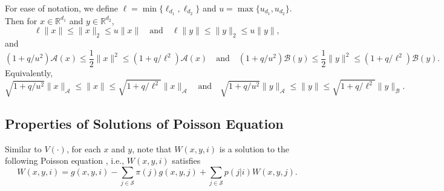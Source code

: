 \documentclass[letterpaper, 10 pt, conference]{ieeeconf}  %
\theoremstyle{definition}
\theoremstyle{plain}
\newcommand{\Scal}{\mathcal{S}}
\newcommand{\RR}{\mathbb{R}}
\newcommand{\Acal}{\mathcal{A}}
\newcommand{\Bcal}{\mathcal{B}}
\begin{document}
For ease of notation, we define $\ell=\min\{\ell_{d_1}, \ell_{d_2}\}$ and $u=\max\{u_{d_1}, u_{d_2}\}$. Then for $x\in\RR^{d_1}$ and $y\in\RR^{d_2}$, 
$$\ell \|x\|\leq \|x\|_2\leq u \|x\|\quad\text{and}\quad\ell\|y\|\leq \|y\|_2\leq u\|y\|,$$ and $$\left(1+q/u^2\right)\Acal(x)\leq \frac{1}{2}\|x\|^2\leq \left(1+q/\ell^2\right)\Acal(x)\quad\text{and}\quad \left(1+q/u^2\right)\Bcal(y)\leq \frac{1}{2}\|y\|^2\leq \left(1+q/\ell^2\right)\Bcal(y).$$ Equivalently, 
$$\sqrt{1+q/u^2}\|x\|_\Acal\leq \|x\|\leq \sqrt{1+q/\ell^2}\|x\|_\Acal\quad\text{and}\quad\sqrt{1+q/u^2}\|y\|_\Acal\leq \|y\|\leq \sqrt{1+q/\ell^2}\|y\|_\Bcal.$$

\subsection{\textbf{Properties of Solutions of Poisson Equation}}\label{app:proof-VandW}
Similar to $V(\cdot)$, for each $x$ and $y$, note that $W(x,y,i)$ is a solution to the following Poisson equation \cite{Benaim}, i.e., $W(x,y,i)$ satisfies
$$W(x,y,i)=g(x,y,i)-\sum_{j\in\Scal}\pi(j)g(x,y,j)+\sum_{j\in\Scal}p(j|i)W(x,y,j).$$
\end{document}
